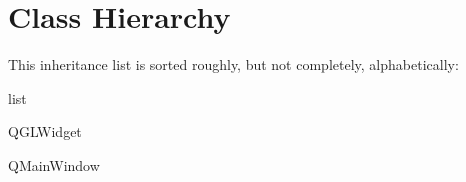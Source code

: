 \section{Class Hierarchy}
This inheritance list is sorted roughly, but not completely, alphabetically\+:\begin{DoxyCompactList}
\item {}
\item {}
\item list\begin{DoxyCompactList}
\item {}
\end{DoxyCompactList}
\item {}
\item {}
\item Q\+G\+L\+Widget\begin{DoxyCompactList}
\item {}
\end{DoxyCompactList}
\item Q\+Main\+Window\begin{DoxyCompactList}
\item {}
\end{DoxyCompactList}
\item {}
\begin{DoxyCompactList}
\item {}
\end{DoxyCompactList}
\end{DoxyCompactList}
